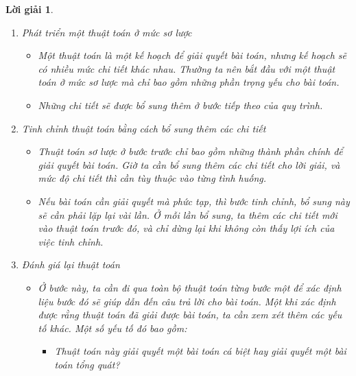 \documentclass[14pt, a4paper]{article}
\theoremstyle{sltheorem}
\theoremstyle{soltheorem}
\newtheorem*{loigiai}{Lời giải}
\begin{document}
\begin{loigiai}
\begin{enumerate}[a)]
\begin{enumerate}[1.]
\begin{itemize}
\begin{itemize}
                        \item Ta sẽ có thêm những thông tin gì?
                        \item Những dữ kiện nào đã thay đổi?
                        \item Những thay đổi đó là gì?
                        \item Những dữ kiện nào đã biến mất?
                    \end{itemize}
                \end{itemize}
                \item Phát triển một thuật toán ở mức sơ lược
                \begin{itemize}
                    \item Một thuật toán là một kế hoạch để giải quyết bài toán, nhưng kế hoạch sẽ có nhiều mức chi tiết khác nhau. Thường ta nên bắt đầu với một thuật toán ở mức sơ lược mà chỉ bao gồm những phần trọng yếu cho bài toán.
                    \item Những chi tiết sẽ được bổ sung thêm ở bước tiếp theo của quy trình.
                \end{itemize}
                \item Tinh chỉnh thuật toán bằng cách bổ sung thêm các chi tiết
                \begin{itemize}
                    \item Thuật toán sơ lược ở bước trước chỉ bao gồm những thành phần chính để giải quyết bài toán. Giờ ta cần bổ sung thêm các chi tiết cho lời giải, và mức độ chi tiết thì cần tùy thuộc vào từng tình huống.
                    \item Nếu bài toán cần giải quyết mà phức tạp, thì bước tinh chỉnh, bổ sung này sẽ cần phải lặp lại vài lần. Ở mỗi lần bổ sung, ta thêm các chi tiết mới vào thuật toán trước đó, và chỉ dừng lại khi không còn thấy lợi ích của việc tinh chỉnh.
                \end{itemize}
                \item Đánh giá lại thuật toán
                \begin{itemize}
                    \item Ở bước này, ta cần đi qua toàn bộ thuật toán từng bước một để xác định liệu bước đó sẽ giúp dẫn đến câu trả lời cho bài toán. Một khi xác định được rằng thuật toán đã giải được bài toán, ta cần xem xét thêm các yếu tố khác. Một số yếu tố đó bao gồm:
                    \begin{itemize}
                        \item Thuật toán này giải quyết một bài toán cá biệt hay giải quyết một bài toán tổng quát?

\end{itemize}
\end{itemize}
\end{enumerate}
\end{enumerate}
\end{loigiai}
\end{document}
